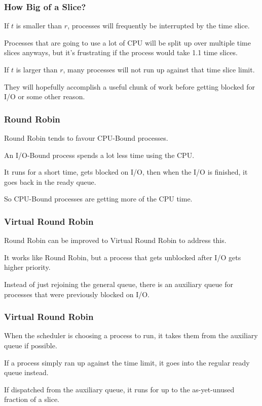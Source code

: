 \begin{frame}
\frametitle{How Big of a Slice?}

If $t$ is smaller than $r$, processes will frequently be interrupted by the time slice. 

Processes that are going to use a lot of CPU will be split up over multiple time slices anyways, but it's frustrating if the process would take 1.1 time slices. 

If $t$ is larger than $r$, many processes will not run up against that time slice limit.

They will hopefully accomplish a useful chunk of work before getting blocked for I/O or some other reason. 

\end{frame}

\begin{frame}
\frametitle{Round Robin}

Round Robin tends to favour CPU-Bound processes. 

An I/O-Bound process spends a lot less time using the CPU. 

It runs for a short time, gets blocked on I/O, then when the I/O is finished, it goes back in the ready queue. 

So CPU-Bound processes are getting more of the CPU time.


\end{frame}


\begin{frame}
\frametitle{Virtual Round Robin}

Round Robin can be improved to Virtual Round Robin to address this. 

It works like Round Robin, but a process that gets unblocked after I/O gets higher priority.

Instead of just rejoining the general queue, there is an auxiliary queue for processes that were previously blocked on I/O.

\end{frame}

\begin{frame}
\frametitle{Virtual Round Robin}

When the scheduler is choosing a process to run, it takes them from the auxiliary queue if possible. 

If a process simply ran up against the time limit, it goes into the regular ready queue instead. 

If dispatched from the auxiliary queue, it runs for up to the as-yet-unused fraction of a slice.

\end{frame}

